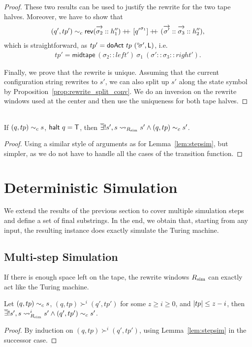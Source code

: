 \begin{proof}
  These two results can be used to justify the rewrite for the two tape halves. Moreover, we have to show that 
  \begin{align*}
    (q', tp') \reprc{} \rev{(\polpos{\sigma_2} :: h_1'')} \concat [{q'}^{\sigma_1}] \concat (\polpos{\sigma'} :: \polpos{\sigma_3} :: h_2''), 
  \end{align*}
  which is straightforward, as $tp' = \textsf{doAct}~tp~(\degree\kern-0.5ex\sigma', \textsf{L})$, i.e.
  \begin{align*}
    tp' = \textsf{midtape}~(\sigma_2 :: left')~\sigma_1~(\sigma' :: \sigma_3 :: right').
  \end{align*}

  Finally, we prove that the rewrite is unique. Assuming that the current configuration string rewrites to $s'$, we can also split up $s'$ along the state symbol by Proposition~\ref{prop:rewrite_split_conv}. We do an inversion on the rewrite windows used at the center and then use the uniqueness for both tape halves.
\end{proof}

\begin{lemma}\label{lem:haltsim}~\\
  If $(q, tp) \sim_c{} s$, $\textsf{halt}~q = \mathsf{T}$, then $\overline{\exists}! s', s \rightsquigarrow_{R_{\text{sim}}} s' \land (q, tp) \sim_c{} s'$.
\end{lemma}
\begin{proof}
  Using a similar style of arguments as for Lemma~\ref{lem:stepsim}, but simpler, as we do not have to handle all the cases of the transition function.
\end{proof}

\section{Deterministic Simulation}
We extend the results of the previous section to cover multiple simulation steps and define a set of final substrings. In the end, we obtain that, starting from any input, the resulting \PR{} instance does exactly simulate the Turing machine.

\subsection{Multi-step Simulation}
If there is enough space left on the tape, the rewrite windows $R_{\text{sim}}$ can exactly act like the Turing machine.

\begin{lemma}\label{lem:multistep_complete}
  Let $(q, tp) \sim_c{} s$, $(q, tp) \succ^i (q', tp')$ for some $z \ge i \ge 0$, and $|tp| \le z - i$, then $\overline{\exists}! s', s \rightsquigarrow_{R_{\text{sim}}}^i s' \land (q', tp') \sim_c{} s'$. 
\end{lemma}
\begin{proof}
  By induction on $(q, tp) \succ^i (q', tp')$, using Lemma~\ref{lem:stepsim} in the successor case. 
\end{proof}


